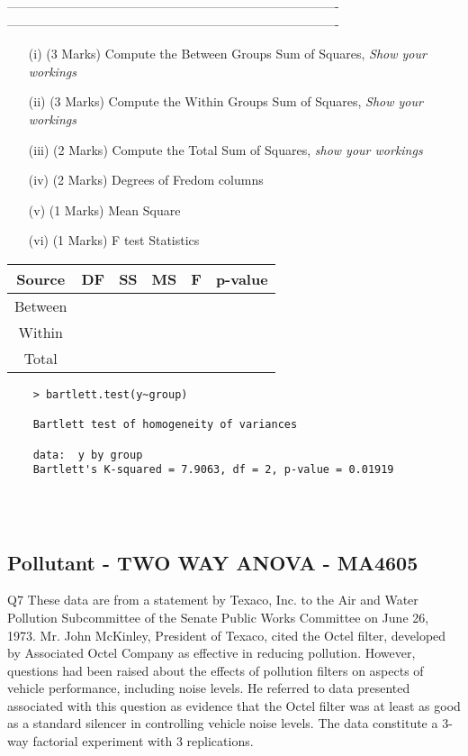 -------------------------------------------------------------------------------
-------------------------------------------------------------------------------



\begin{itemize}
	\item[(i)](3 Marks) Compute the Between Groups Sum of Squares, \textit{Show your workings}
	\item[(ii)](3 Marks) Compute the Within Groups Sum of Squares, \textit{Show your workings}
	\item[(iii)](2 Marks) Compute the Total Sum of Squares,\textit{ show your workings}
	\item[(iv)] (2 Marks) Degrees of Fredom columns
	\item[(v)] (1 Marks) Mean Square
	\item[(vi)] (1 Marks) F test Statistics
\end{itemize}
\begin{tabular}{|c|c|c|c|c|c|}
	\hline Source & DF & SS & MS & F & p-value \\ 
	\hline Between &  &  &  &  &  \\ 
	\hline Within &  &  &  &  &  \\ 
	\hline Total &  &  &  &  &  \\ 
	\hline 
\end{tabular} 
\begin{framed}
	\begin{verbatim}
	> bartlett.test(y~group)
	
	Bartlett test of homogeneity of variances
	
	data:  y by group
	Bartlett's K-squared = 7.9063, df = 2, p-value = 0.01919
	
	\end{verbatim}
\end{framed}

\

\subsection{Pollutant - TWO WAY ANOVA - MA4605}
Q7 These data are from a statement by Texaco, Inc. to the Air and Water Pollution Subcommittee of the Senate Public Works Committee on June 26, 1973. Mr. John McKinley, President of Texaco, cited the Octel filter, developed by Associated Octel Company as effective in reducing pollution. However, questions had been raised about the effects of pollution filters on aspects of vehicle performance, including noise levels. He referred to data presented associated with this question as evidence that the Octel filter was at least as good as a standard silencer in controlling vehicle noise levels. The data constitute a 3-way factorial experiment with 3 replications.

